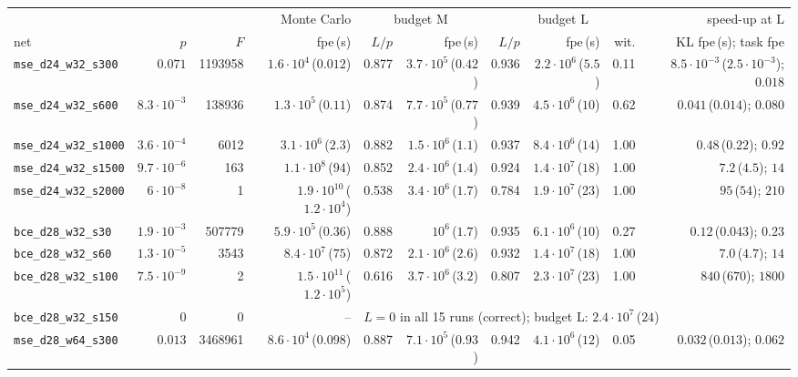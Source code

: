 \begin{tabular}{lrrrrrrrrr}
\toprule
& & & Monte Carlo & \multicolumn{2}{c}{budget M} & \multicolumn{3}{c}{budget L} & speed-up at L\\
\cmidrule(lr){5-6}\cmidrule(lr){7-9}\cmidrule(lr){10-10}
net & $p$ & $F$ & fpe\,(s) & $L/p$ & fpe\,(s) & $L/p$ & fpe\,(s) & wit. & KL fpe\,(s); task fpe\\
\midrule
\texttt{mse\_d24\_w32\_s300} & $0.071$ & 1193958 & $1.6\cdot10^{4}$\,($0.012$) & 0.877 & $3.7\cdot10^{5}$\,($0.42$) & 0.936 & $2.2\cdot10^{6}$\,($5.5$) & 0.11 & $8.5\cdot10^{-3}$\,($2.5\cdot10^{-3}$); $0.018$\\
\texttt{mse\_d24\_w32\_s600} & $8.3\cdot10^{-3}$ & 138936 & $1.3\cdot10^{5}$\,($0.11$) & 0.874 & $7.7\cdot10^{5}$\,($0.77$) & 0.939 & $4.5\cdot10^{6}$\,($10$) & 0.62 & $0.041$\,($0.014$); $0.080$\\
\texttt{mse\_d24\_w32\_s1000} & $3.6\cdot10^{-4}$ & 6012 & $3.1\cdot10^{6}$\,($2.3$) & 0.882 & $1.5\cdot10^{6}$\,($1.1$) & 0.937 & $8.4\cdot10^{6}$\,($14$) & 1.00 & $0.48$\,($0.22$); $0.92$\\
\texttt{mse\_d24\_w32\_s1500} & $9.7\cdot10^{-6}$ & 163 & $1.1\cdot10^{8}$\,($94$) & 0.852 & $2.4\cdot10^{6}$\,($1.4$) & 0.924 & $1.4\cdot10^{7}$\,($18$) & 1.00 & $7.2$\,($4.5$); $14$\\
\texttt{mse\_d24\_w32\_s2000} & $6\cdot10^{-8}$ & 1 & $1.9\cdot10^{10}$\,($1.2\cdot10^{4}$) & 0.538 & $3.4\cdot10^{6}$\,($1.7$) & 0.784 & $1.9\cdot10^{7}$\,($23$) & 1.00 & $95$\,($54$); $210$\\
\texttt{bce\_d28\_w32\_s30} & $1.9\cdot10^{-3}$ & 507779 & $5.9\cdot10^{5}$\,($0.36$) & 0.888 & $10^{6}$\,($1.7$) & 0.935 & $6.1\cdot10^{6}$\,($10$) & 0.27 & $0.12$\,($0.043$); $0.23$\\
\texttt{bce\_d28\_w32\_s60} & $1.3\cdot10^{-5}$ & 3543 & $8.4\cdot10^{7}$\,($75$) & 0.872 & $2.1\cdot10^{6}$\,($2.6$) & 0.932 & $1.4\cdot10^{7}$\,($18$) & 1.00 & $7.0$\,($4.7$); $14$\\
\texttt{bce\_d28\_w32\_s100} & $7.5\cdot10^{-9}$ & 2 & $1.5\cdot10^{11}$\,($1.2\cdot10^{5}$) & 0.616 & $3.7\cdot10^{6}$\,($3.2$) & 0.807 & $2.3\cdot10^{7}$\,($23$) & 1.00 & $840$\,($670$); $1800$\\
\texttt{bce\_d28\_w32\_s150} & 0 & 0 & -- & \multicolumn{6}{l}{$L=0$ in all 15 runs (correct); budget L: $2.4\cdot10^{7}$\,($24$)}\\
\texttt{mse\_d28\_w64\_s300} & $0.013$ & 3468961 & $8.6\cdot10^{4}$\,($0.098$) & 0.887 & $7.1\cdot10^{5}$\,($0.93$) & 0.942 & $4.1\cdot10^{6}$\,($12$) & 0.05 & $0.032$\,($0.013$); $0.062$\\

\end{tabular}
